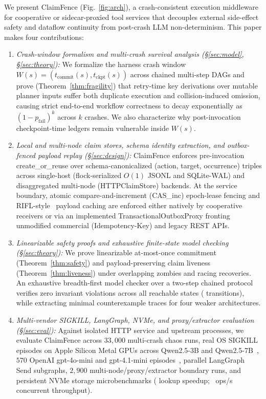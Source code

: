 \documentclass[10pt,journal]{IEEEtran}
\def\CF{ClaimFence}%
\def\texttt#1{#1}%
\theoremstyle{definition}
\theoremstyle{remark}
\newcommand{\CF}{\textsc{ClaimFence}}
\begin{document}
We present \CF{} (Fig.~\ref{fig:arch}), a crash-consistent execution middleware for cooperative or sidecar-proxied tool services that decouples external side-effect safety and dataflow continuity from post-crash LLM non-determinism. This paper makes four contributions:
\begin{enumerate}
  \item \emph{Crash-window formalism and multi-crash survival analysis (\S\ref{sec:model}, \S\ref{sec:theory}):} We formalize the harness crash window $W(s) = (t_{\mathrm{commit}}(s), t_{\mathrm{ckpt}}(s))$ across chained multi-step DAGs and prove (Theorem~\ref{thm:fragility}) that retry-time key derivations over mutable planner inputs suffer both duplicate execution and collision-induced omission, causing strict end-to-end workflow correctness to decay exponentially as $(1 - p_{\mathrm{fail}})^k$ across $k$ crashes. We also characterize why post-invocation checkpoint-time ledgers remain vulnerable inside $W(s)$.
  \item \emph{Local and multi-node claim stores, schema identity extraction, and outbox-fenced payload replay (\S\ref{sec:design}):} \CF{} enforces pre-invocation \texttt{create\_or\_reuse} over schema-canonicalized \texttt{(action, target, occurrence)} triples across single-host (\texttt{flock}-serialized $O(1)$ \texttt{JSONL} and \texttt{SQLite-WAL}) and disaggregated multi-node (\texttt{HTTPClaimStore}) backends. At the service boundary, atomic compare-and-increment (\texttt{CAS\_inc}) epoch-lease fencing and RIFL-style~\cite{lee2015rifl} payload caching are enforced either natively by cooperative receivers or via an implemented \texttt{TransactionalOutboxProxy} fronting unmodified commercial (\texttt{Idempotency-Key}) and legacy REST APIs.
  \item \emph{Linearizable safety proofs and exhaustive finite-state model checking (\S\ref{sec:theory}):} We prove linearizable at-most-once commitment (Theorem~\ref{thm:safety}) and payload-preserving claim liveness (Theorem~\ref{thm:liveness}) under overlapping zombies and racing recoveries. An exhaustive breadth-first model checker over a two-step chained protocol verifies zero invariant violations across all \MCCFStates{} reachable states (\MCCFEdges{} transitions), while extracting minimal counterexample traces for four weaker architectures.
  \item \emph{Multi-vendor \texttt{SIGKILL}, \texttt{LangGraph}, NVMe, and proxy/extractor evaluation (\S\ref{sec:eval}):} Against isolated HTTP service and upstream processes, we evaluate \CF{} across $33{,}000$ multi-crash chaos runs, \TotalMMSSigkillEps{} real OS \texttt{SIGKILL} episodes on Apple Silicon Metal GPUs across \texttt{Qwen2.5-3B} and \texttt{Qwen2.5-7B}~\cite{qwen2025technical}, $570$ \texttt{OpenAI} \texttt{gpt-4o-mini} and \texttt{gpt-4.1-mini} episodes~\cite{openai2024gpt4o}, parallel \texttt{LangGraph} \texttt{Send} subgraphs, $2{,}900$ multi-node/proxy/extractor boundary runs, and persistent NVMe storage microbenchmarks (\ScaleTenKSpeedup{} lookup speedup; \HttpPeakOps{}~ops/s concurrent throughput).
\end{enumerate}
\end{document}
